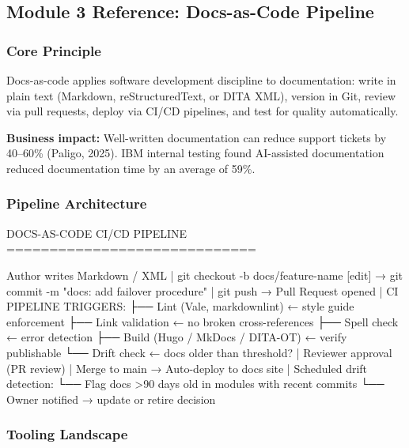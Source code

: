 \documentclass[11pt,letterpaper]{article}
\begin{document}
\subsection{Module 3 Reference: Docs-as-Code Pipeline}

\subsubsection{Core Principle}

Docs-as-code applies software development discipline to documentation: write in plain text (Markdown, reStructuredText, or DITA XML), version in Git, review via pull requests, deploy via CI/CD pipelines, and test for quality automatically.

\textbf{Business impact:} Well-written documentation can reduce support tickets by 40--60\% (Paligo, 2025). IBM internal testing found AI-assisted documentation reduced documentation time by an average of 59\%.

\subsubsection{Pipeline Architecture}

\begin{asciibox}
DOCS-AS-CODE CI/CD PIPELINE
=============================

Author writes Markdown / XML
         |
  git checkout -b docs/feature-name
  [edit] → git commit -m "docs: add failover procedure"
         |
  git push → Pull Request opened
         |
  CI PIPELINE TRIGGERS:
  ├── Lint (Vale, markdownlint)       ← style guide enforcement
  ├── Link validation                 ← no broken cross-references
  ├── Spell check                     ← error detection
  ├── Build (Hugo / MkDocs / DITA-OT) ← verify publishable
  └── Drift check                     ← docs older than threshold?
         |
  Reviewer approval (PR review)
         |
  Merge to main → Auto-deploy to docs site
         |
  Scheduled drift detection:
  └── Flag docs >90 days old in modules with recent commits
      └── Owner notified → update or retire decision
\end{asciibox}

\subsubsection{Tooling Landscape}
\end{document}
